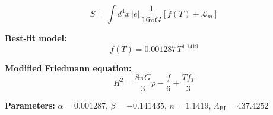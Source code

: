 
\begin{equation}
  S = \int d^4x \, |e| \, \frac{1}{16\pi G} \left[ f(T) + \mathcal{L}_m \right]
\end{equation}

\textbf{Best-fit model:}
\begin{equation}
  f(T) = 0.001287 \, T^{1.1419}
\end{equation}

\textbf{Modified Friedmann equation:}
\begin{equation}
  H^2 = \frac{8\pi G}{3} \rho - \frac{f}{6} + \frac{T f_T}{3}
\end{equation}

\textbf{Parameters:}
$\alpha = 0.001287$, \quad
$\beta = -0.141435$, \quad
$n = 1.1419$, \quad
$\Lambda_{\text{BI}} = 437.4252$